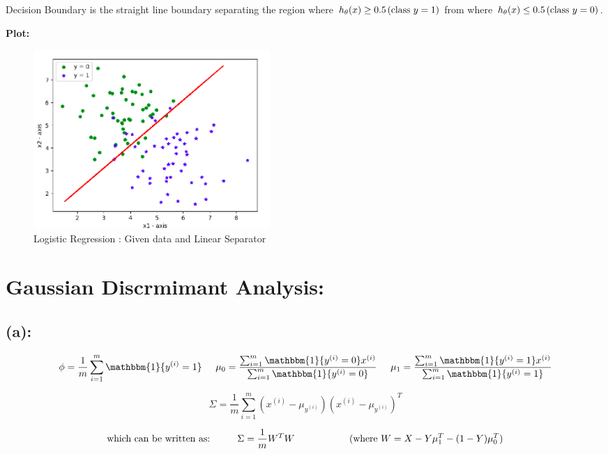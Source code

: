 \documentclass[a4 paper]{article}
\begin{document}
\hspace*{-0.2cm} 
Decision Boundary is the straight line boundary separating the region where $h_\theta(x) \geq 0.5 \hspace*{0.5mm} (\text{class } y=1)$ from
where $h_\theta(x) \leq 0.5 \hspace*{0.5mm} (\text{class } y=0)$.

\newpage
\hspace*{-0.2cm} 
\textbf{Plot:}
\begin{figure}[H]
	\centering
	  \includegraphics[width = 90mm]{./Plots/3.png}
	  \caption{Logistic Regression : Given data and Linear Separator}
  	\label{fig7}
\end{figure}

\section{Gaussian Discrmimant Analysis:}

\subsection*{(a):}

$$ \phi = \frac{1}{m} \sum_{i=1}^{m} \mathbbm{1}\{y^{(i)}=1\} \hspace*{0.5cm}
\mu_0 = \frac{\sum_{i=1}^{m} \mathbbm{1}\{y^{(i)}=0\} x^{(i)}}{\sum_{i=1}^{m} \mathbbm{1}\{y^{(i)}=0\}} \hspace*{0.5cm}
\mu_1 = \frac{\sum_{i=1}^{m} \mathbbm{1}\{y^{(i)}=1\} x^{(i)}}{\sum_{i=1}^{m} \mathbbm{1}\{y^{(i)}=1\}}  $$

$$ \Sigma = \frac{1}{m} \sum_{i=1}^{m} (x^{(i)}-\mu_{y^{(i)}})(x^{(i)}-\mu_{y^{(i)}})^{T}$$

$$ \text{which can be written as:} \hspace*{1cm} \Sigma = \frac{1}{m} W^T W \hspace*{2cm} (\text{where } W = X - Y\mu_1^T - (1-Y)\mu_0^T) $$
\end{document}
